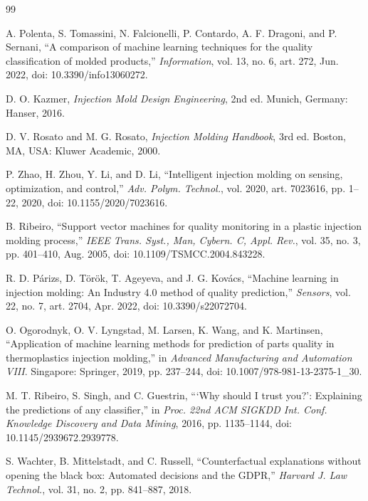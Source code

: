 \documentclass[11pt,a4paper]{article}
\begin{document}
\begin{thebibliography}{99}
\footnotesize

 A. Polenta, S. Tomassini, N. Falcionelli, P. Contardo, A. F. Dragoni, and P. Sernani, ``A comparison of machine learning techniques for the quality classification of molded products,'' \emph{Information}, vol. 13, no. 6, art. 272, Jun. 2022, doi: 10.3390/info13060272.

 D. O. Kazmer, \emph{Injection Mold Design Engineering}, 2nd ed. Munich, Germany: Hanser, 2016.

 D. V. Rosato and M. G. Rosato, \emph{Injection Molding Handbook}, 3rd ed. Boston, MA, USA: Kluwer Academic, 2000.

 P. Zhao, H. Zhou, Y. Li, and D. Li, ``Intelligent injection molding on sensing, optimization, and control,'' \emph{Adv. Polym. Technol.}, vol. 2020, art. 7023616, pp. 1--22, 2020, doi: 10.1155/2020/7023616.

 B. Ribeiro, ``Support vector machines for quality monitoring in a plastic injection molding process,'' \emph{IEEE Trans. Syst., Man, Cybern. C, Appl. Rev.}, vol. 35, no. 3, pp. 401--410, Aug. 2005, doi: 10.1109/TSMCC.2004.843228.

 R. D. P\'{a}rizs, D. T\"{o}r\"{o}k, T. Ageyeva, and J. G. Kov\'{a}cs, ``Machine learning in injection molding: An Industry 4.0 method of quality prediction,'' \emph{Sensors}, vol. 22, no. 7, art. 2704, Apr. 2022, doi: 10.3390/s22072704.

 O. Ogorodnyk, O. V. Lyngstad, M. Larsen, K. Wang, and K. Martinsen, ``Application of machine learning methods for prediction of parts quality in thermoplastics injection molding,'' in \emph{Advanced Manufacturing and Automation VIII}. Singapore: Springer, 2019, pp. 237--244, doi: 10.1007/978-981-13-2375-1\_30.

 M. T. Ribeiro, S. Singh, and C. Guestrin, ```Why should I trust you?': Explaining the predictions of any classifier,'' in \emph{Proc. 22nd ACM SIGKDD Int. Conf. Knowledge Discovery and Data Mining}, 2016, pp. 1135--1144, doi: 10.1145/2939672.2939778.

 S. Wachter, B. Mittelstadt, and C. Russell, ``Counterfactual explanations without opening the black box: Automated decisions and the GDPR,'' \emph{Harvard J. Law Technol.}, vol. 31, no. 2, pp. 841--887, 2018.


\end{thebibliography}
\end{document}
